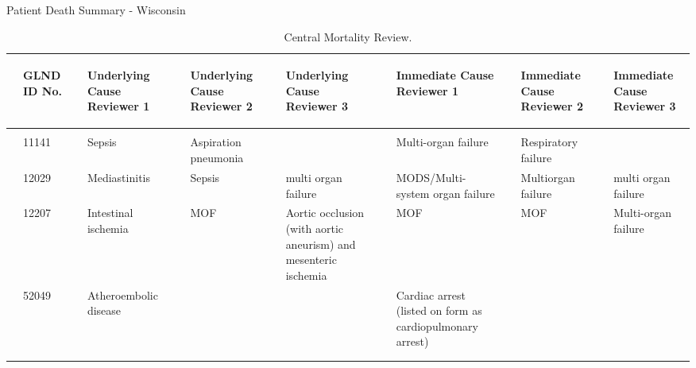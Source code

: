 \documentclass[dvips, 10pt]{article}
\begin{document}
\begin{sidewaystable}
\caption{Patient Death Summary - Wisconsin}
\end{sidewaystable}
\clearpage
\begin{table}[t]
\caption
{ Central Mortality Review. }
\begin{center}
\begin{tabular}{ @{}l@{}
@{}p{0.75in}@{}@{}p{1.5em}@{}@{}p{0.75in}@{}@{}p{1.5em}@{}@{}p{0.75in}@{}@{}p{1.5em}@{}@{}p{0.75in}@{}@{}p{1.5em}@{}@{}p{0.75in}@{}@{}p{1.5em}@{}@{}p{0.75in}@{}@{}p{1.5em}@{}@{}p{0.75in}@{}
}
\hline

& \parbox{6em}{\begin{center}GLND ID No.\end{center}} && \parbox{6em}{\begin{center}Underlying Cause Reviewer 1\end{center}} && \parbox{6em}{\begin{center}Underlying Cause Reviewer 2\end{center}} && \parbox{6em}{\begin{center}Underlying Cause Reviewer 3\end{center}} && \parbox{6em}{\begin{center}Immediate Cause Reviewer 1\end{center}} && \parbox{6em}{\begin{center}Immediate Cause Reviewer 2\end{center}} && \parbox{6em}{\begin{center}Immediate Cause Reviewer 3\end{center}} \\

\hline

\\
& 11141 && Sepsis && Aspiration pneumonia &&  && Multi-organ failure && Respiratory failure &&  \\
& 12029 && Mediastinitis && Sepsis && multi organ failure && MODS/Multi-system organ failure && Multiorgan failure && multi organ failure \\
& 12207 && Intestinal ischemia && MOF && Aortic occlusion (with aortic aneurism) and mesenteric ischemia && MOF && MOF && Multi-organ failure \\
& 52049 && Atheroembolic disease &&  &&  && Cardiac arrest (listed on form as cardiopulmonary arrest) &&  &&  \\
\\
\hline \\

\end{tabular}

\end{center}
 \end{table}
\end{document}
